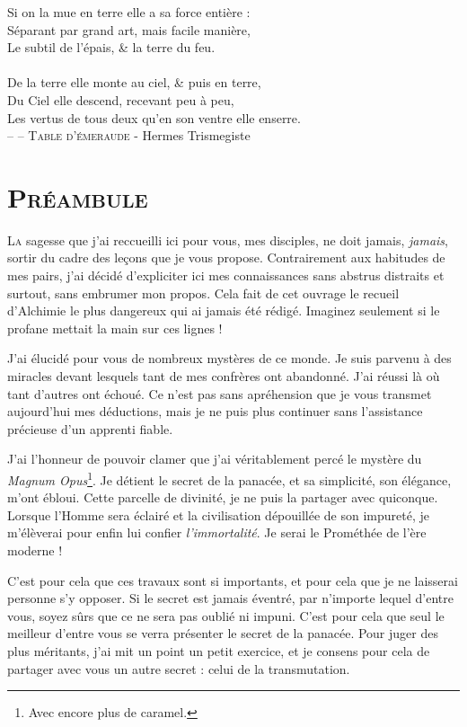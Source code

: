 \noindent
Si on la mue en terre elle a sa force entière :\\
Séparant par grand art, mais facile manière,\\
Le subtil de l'épais, \& la terre du feu.\\
\\
De la terre elle monte au ciel, \& puis en terre,\\
Du Ciel elle descend, recevant peu à peu,\\
Les vertus de tous deux qu'en son ventre elle enserre.\\

\small{-- -- \textsc{Table d'émeraude} - Hermes Trismegiste}

\newpage

\section{\textsc{Préambule}}

\lettrine{L}{a} sagesse que j'ai reccueilli ici pour vous, mes disciples, ne doit jamais,
\emph{jamais}, sortir du cadre des leçons que je vous propose.
Contrairement aux habitudes de mes pairs, j'ai décidé d'expliciter ici mes
connaissances sans abstrus distraits et surtout, sans embrumer mon
propos. Cela fait de cet ouvrage le recueil d'Alchimie le plus dangereux qui
ai jamais été rédigé. Imaginez seulement si le profane mettait la main sur ces
lignes !

J'ai élucidé pour vous de nombreux mystères de ce monde. Je suis parvenu à des
miracles devant lesquels tant de mes confrères ont abandonné. J'ai réussi là où
tant d'autres ont échoué. Ce n'est pas
sans apréhension que je vous transmet aujourd'hui mes déductions, mais je ne puis
plus continuer sans l'assistance précieuse d'un apprenti fiable.

J'ai l'honneur de pouvoir clamer que j'ai véritablement percé le mystère du
\emph{Magnum Opus}\footnote{Avec encore plus de caramel.}. Je détient le secret de la panacée, et sa simplicité, son
élégance, m'ont ébloui. Cette parcelle de divinité, je ne puis la partager avec
quiconque. Lorsque l'Homme sera éclairé et la civilisation dépouillée de son
impureté, je m'élèverai pour enfin lui confier \emph{l'immortalité}. Je serai
le Prométhée de l'ère moderne !

C'est pour cela que ces travaux sont si importants, et pour cela que je ne
laisserai personne s'y opposer. Si le secret est jamais éventré, par n'importe
lequel d'entre vous, soyez sûrs que ce ne sera pas oublié ni impuni.
C'est pour cela que seul le meilleur d'entre vous se verra présenter le secret
de la panacée. Pour juger des plus méritants, j'ai mit un point un petit
exercice, et je consens pour cela de partager avec vous un autre secret : celui
de la transmutation.


